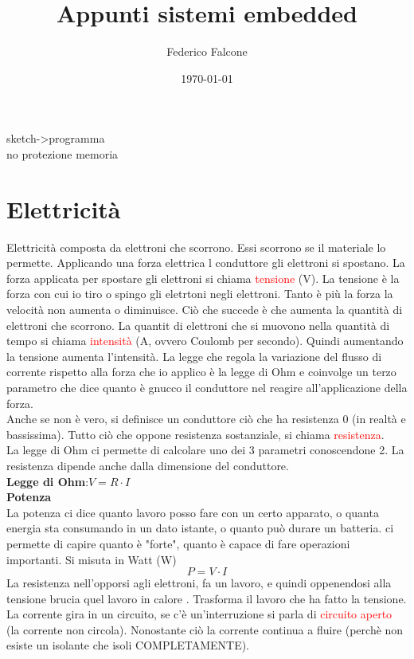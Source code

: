 \documentclass{article}
\title{Appunti sistemi embedded}
\author{Federico Falcone}
\date{\today}
\begin{document}
\maketitle
\tableofcontents
\newpage

sketch->programma \\
no protezione memoria

\section{Elettricità}
Elettricità composta da elettroni che scorrono. Essi scorrono se il materiale lo permette. Applicando una forza elettrica l conduttore gli elettroni si spostano.
La forza applicata per spostare gli elettroni si chiama \textcolor{red}{tensione} (V). La tensione è la forza con cui io tiro o spingo gli eletrtoni negli elettroni. Tanto è più la forza la velocità non aumenta o diminuisce. Ciò che succede è che aumenta la quantità
di elettroni che scorrono. La quantit di elettroni che si muovono nella quantità di tempo si chiama \textcolor{red}{intensità} (A, ovvero Coulomb per secondo). Quindi aumentando la tensione aumenta l'intensità.
La legge che regola la variazione del flusso di corrente rispetto alla forza che io applico è la legge di Ohm e coinvolge un terzo parametro che dice quanto è gnucco il conduttore nel reagire all'applicazione della forza.
\\ Anche se non è vero, si definisce un conduttore ciò che ha resistenza 0 (in realtà e bassissima). Tutto ciò che oppone resistenza sostanziale, si chiama \textcolor{red}{resistenza}.
\\ La legge di Ohm ci permette di calcolare uno dei 3 parametri conoscendone 2.
La resistenza dipende anche dalla dimensione del conduttore.
\\\textbf{Legge di Ohm}:$V=R \cdot I $\\
\textbf{Potenza}\\
La potenza ci dice quanto lavoro posso fare con un certo apparato, o quanta energia sta consumando in un dato istante, o quanto può durare un batteria. ci permette di capire quanto è "forte", quanto è capace di fare operazioni importanti.
Si misuta in Watt (W)
\[ P=V \cdot I \]
La resistenza nell'opporsi agli elettroni, fa un lavoro, e quindi oppenendosi alla tensione brucia quel lavoro in calore . Trasforma il lavoro che ha fatto la tensione.
\\ La corrente gira in un circuito, se c'è un'interruzione si parla di \textcolor{red}{circuito aperto} (la corrente non circola). Nonostante ciò la corrente continua a fluire (perchè non esiste un isolante che isoli COMPLETAMENTE).
\end{document}
